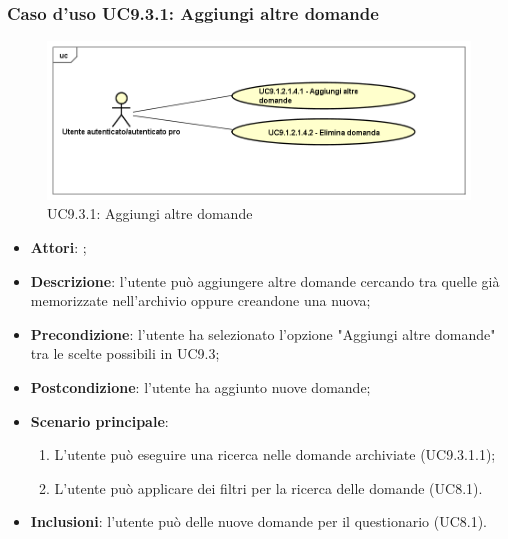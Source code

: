 		 \subsubsection{Caso d'uso UC9.3.1: Aggiungi altre domande}
		 \label{UC9.3.1}
		 \begin{figure}[h]
		 	\centering
		 	\includegraphics[scale=0.5,keepaspectratio]{UML/UC9_3_1.png}
		 	\caption{UC9.3.1: Aggiungi altre domande}
		 \end{figure}
		 \FloatBarrier
		 \begin{itemize}
		 	\item \textbf{Attori}: \uaupro;
		 	\item \textbf{Descrizione}: l'utente può aggiungere altre domande cercando tra quelle già memorizzate nell'archivio oppure creandone una nuova; 
		 	\item \textbf{Precondizione}: l'utente ha selezionato l'opzione "Aggiungi altre domande" tra le scelte possibili in UC9.3;
		 	\item \textbf{Postcondizione}: l'utente ha aggiunto nuove domande;
		 	\item \textbf{Scenario principale}:
		 	\begin{enumerate}
		 		\item L'utente può eseguire una ricerca nelle domande archiviate (UC9.3.1.1);
		 		\item L'utente può applicare dei filtri per la ricerca delle domande (UC8.1).
		 	\end{enumerate}
		 	\item \textbf{Inclusioni}: l'utente può delle nuove domande per il questionario (UC8.1).		
		 \end{itemize}
		 

